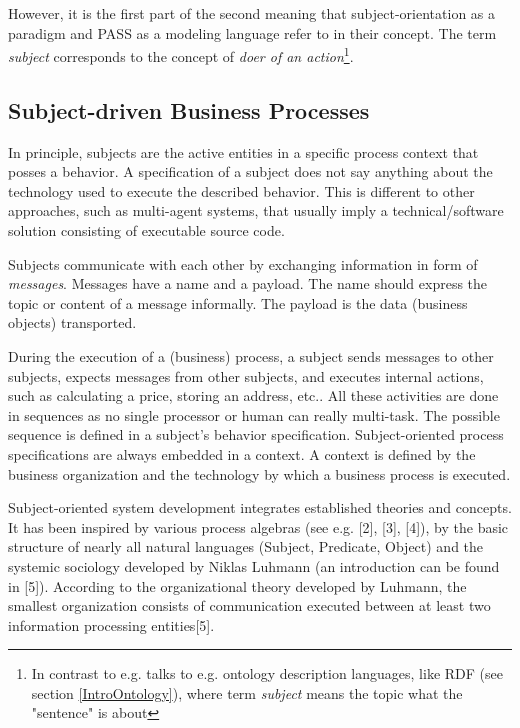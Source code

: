 However, it is the first part of the second meaning that subject-orientation as a paradigm and PASS as a modeling language refer to in their concept. The term \textit{subject} corresponds to the concept of \textit{doer of an action}\footnote{In contrast to e.g. talks to e.g. ontology description languages, like RDF  (see section \ref{IntroOntology}), where term \textit{subject} means the topic what the "sentence" is about}.

\subsection{Subject-driven Business Processes}

In principle, subjects are the active entities in a specific process context that posses a behavior. A specification of a subject does not say anything about the technology used to execute the described behavior. This is different to other approaches, such as multi-agent systems, that usually imply a technical/software solution consisting of executable source code.

Subjects communicate with each other by exchanging information in form of \textit{messages}. Messages have a name and a payload. The name should express the topic or content of a message informally. The payload is the data (business objects) transported. 

During the execution of a (business) process, a subject sends messages to other subjects, expects messages from other subjects, and executes internal actions, such as calculating a price, storing an address, etc.. All these activities are done in sequences as no single processor or human can really multi-task. The possible sequence is defined in a subject's behavior specification. Subject-oriented process specifications are always embedded in a context. A context is defined by the business organization and the technology by which a business process is executed.

Subject-oriented system development integrates established theories and concepts. It has been inspired by various process algebras (see e.g. [2], [3], [4]), by the basic structure of nearly all natural languages (Subject, Predicate, Object) and the systemic sociology developed by Niklas Luhmann (an introduction can be found in [5]). According to the organizational theory developed by Luhmann, the smallest organization consists of communication executed between at least two information processing entities[5]. 

